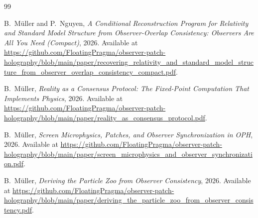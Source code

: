 \begin{thebibliography}{99}

B.~M\"uller and P.~Nguyen,
\emph{A Conditional Reconstruction Program for Relativity and Standard Model Structure from Observer-Overlap Consistency: Observers Are All You Need (Compact)},
2026.
Available at \url{https://github.com/FloatingPragma/observer-patch-holography/blob/main/paper/recovering_relativity_and_standard_model_structure_from_observer_overlap_consistency_compact.pdf}.

B.~M\"uller,
\emph{Reality as a Consensus Protocol: The Fixed-Point Computation That Implements Physics},
2026.
Available at \url{https://github.com/FloatingPragma/observer-patch-holography/blob/main/paper/reality_as_consensus_protocol.pdf}.

B.~M\"uller,
\emph{Screen Microphysics, Patches, and Observer Synchronization in OPH},
2026.
Available at \url{https://github.com/FloatingPragma/observer-patch-holography/blob/main/paper/screen_microphysics_and_observer_synchronization.pdf}.

B.~M\"uller,
\emph{Deriving the Particle Zoo from Observer Consistency},
2026.
Available at \url{https://github.com/FloatingPragma/observer-patch-holography/blob/main/paper/deriving_the_particle_zoo_from_observer_consistency.pdf}.



\end{thebibliography}
